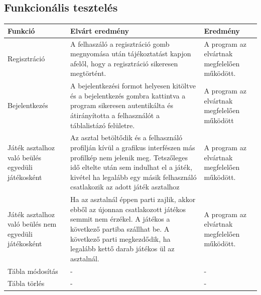 \subsection{Funkcionális tesztelés}
\begin{tabular}{| C{4.7cm} | C{4.7cm} | C{4.7cm} |}
\hline
  Funkció & Elvárt eredmény & Eredmény \\ \hline
  Regisztráció & A felhaszáló a regisztráció gomb megnyomása után tájékoztatást kapjon afelől, hogy a regisztráció sikeresen megtörtént. & A program az elvártnak megfelelően működött. \\ \hline
  Bejelentkezés & A bejelentkezési formot helyesen kitöltve és a bejelentkezés gombra kattintva a program sikeresen autentikálta és átirányította a felhasználót a táblalistázó felületre. & A program az elvártnak megfelelően működött  \\ \hline
  Játék asztalhoz való beülés egyedüli játékosként & Az asztal betöltődik és a felhasználó profilján kívül a grafikus interfészen más profilkép nem jelenik meg. Tetszőleges idő eltelte után sem indulhat el a játék, kivétel ha legalább egy másik felhasználó csatlakozik az adott játék asztalhoz  & A program az elvártnak megfelelően működött. \\ \hline
  Játék asztalhoz való beülés nem egyedüli játékosként & Ha az asztalnál éppen parti zajlik, akkor ebből az újonnan csatlakozott játékos semmit nem érzékel. A játékos a következő partiba szállhat be. A következő parti megkezdődik, ha legalább kettő darab játékos ül az asztalnál. & A program az elvártnak megfelelően működött. \\ \hline
  Tábla módosítás & - & - \\ \hline
  Tábla törlés & - & - \\ \hline
\end{tabular}

